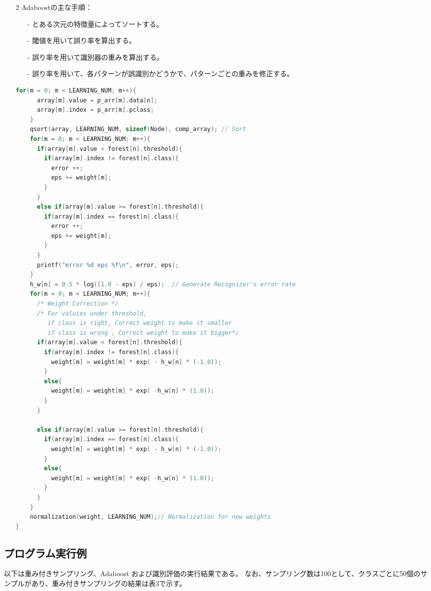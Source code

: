 \documentclass[ %
  uplatex,%
  papersize%
]{jsarticle}
\begin{document}
\begin{itemize}
\item[2] Adaboostの主な手順：
\begin{itemize}
\footnotesize
\item[-]とある次元の特徴量によってソートする。
\item[-]閾値を用いて誤り率を算出する。
\item[-]誤り率を用いて識別器の重みを算出する。
\item[-]誤り率を用いて、各パターンが誤識別かどうかで、パターンごとの重みを修正する。
\end{itemize}
\begin{lstlisting}[language=c,caption=Judge Class under Threshold]
for(m = 0; m < LEARNING_NUM; m++){
      array[m].value = p_arr[m].data[n];
      array[m].index = p_arr[m].pclass;
    }
    qsort(array, LEARNING_NUM, sizeof(Node), comp_array); // Sort
    for(m = 0; m < LEARNING_NUM; m++){
      if(array[m].value < forest[n].threshold){
        if(array[m].index != forest[n].class){
          error ++;
          eps += weight[m];
        }
      }
      else if(array[m].value >= forest[n].threshold){
        if(array[m].index == forest[n].class){
          error ++;
          eps += weight[m];
        }
      }
      printf("error %d eps %f\n", error, eps);
    }
    h_w[n] = 0.5 * log((1.0 - eps) / eps);	// Generate Recognizer's error rate
    for(m = 0; m < LEARNING_NUM; m++){
      /* Weight Correction */
      /* For valuies under threshold,
         if class is right, Correct weight to make it smaller
         if class is wrong , Correct weight to make it bigger*/
      if(array[m].value < forest[n].threshold){
        if(array[m].index != forest[n].class){
          weight[m] = weight[m] * exp( - h_w[n] * (-1.0));
        }
        else{
          weight[m] = weight[m] * exp( -h_w[n] * (1.0));
        }
      }
	
      else if(array[m].value >= forest[n].threshold){
        if(array[m].index == forest[n].class){
          weight[m] = weight[m] * exp( - h_w[n] * (-1.0));
        }
        else{
          weight[m] = weight[m] * exp( -h_w[n] * (1.0));
        }
      }
    }
    normalization(weight, LEARNING_NUM);// Normalization for new weights
}    
    \end{lstlisting}
\end{itemize}

\subsection{プログラム実行例}
以下は重み付きサンプリング、Adaboost および識別評価の実行結果である。
なお、サンプリング数は100として、クラスごとに50個のサンプルがあり、重み付きサンプリングの結果は表3で示す。
\newpage
\end{document}
